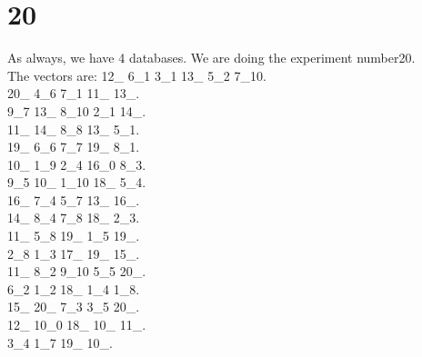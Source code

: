 \chapter{20}
\indent As always, we have 4 databases. We are doing the experiment number20.\\
The vectors are:
12\_ 6\_1 3\_1 13\_ 5\_2 7\_10.\\20\_ 4\_6 7\_1 11\_ 13\_.\\9\_7 13\_ 8\_10 2\_1 14\_.\\11\_ 14\_ 8\_8 13\_ 5\_1.\\19\_ 6\_6 7\_7 19\_ 8\_1.\\10\_ 1\_9 2\_4 16\_0 8\_3.\\9\_5 10\_ 1\_10 18\_ 5\_4.\\16\_ 7\_4 5\_7 13\_ 16\_.\\14\_ 8\_4 7\_8 18\_ 2\_3.\\11\_ 5\_8 19\_ 1\_5 19\_.\\2\_8 1\_3 17\_ 19\_ 15\_.\\11\_ 8\_2 9\_10 5\_5 20\_.\\6\_2 1\_2 18\_ 1\_4 1\_8.\\15\_ 20\_ 7\_3 3\_5 20\_.\\12\_ 10\_0 18\_ 10\_ 11\_.\\3\_4 1\_7 19\_ 10\_.\\
